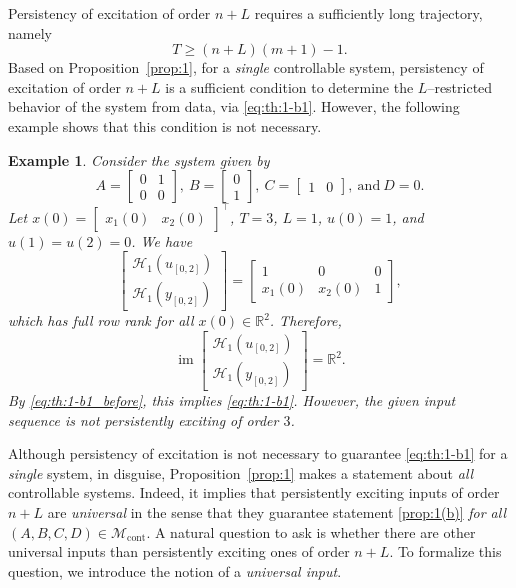 \documentclass[journal,twoside,web]{ieeecolor}
\newtheorem{example}[theorem]{Example}
\DeclareMathOperator{\im}{im}
\begin{document}
Persistency of excitation of order $n+L$ requires a sufficiently long trajectory, namely
\begin{equation}
T\geq (n+L)(m+1)-1.
\end{equation}
Based on Proposition~\ref{prop:1}, for a \emph{single} controllable system, persistency of excitation of order $n+L$ is a sufficient condition to determine the $L$--restricted behavior of the system from data, via \eqref{eq:th:1-b1}. However, the following example shows that this condition is not necessary. 
\begin{example}
\label{ex:1}
Consider the system given by
\begin{equation}
A=\begin{bmatrix}
0 & 1 \\
0 & 0
\end{bmatrix},\ B=\begin{bmatrix}
0 \\ 1
\end{bmatrix},\ C=\begin{bmatrix}
1 & 0
\end{bmatrix},\ \text{and}\ D=0.
\end{equation}
Let $x(0)=\begin{bmatrix}
x_1(0) & x_2(0)
\end{bmatrix}^\top$, $T=3$, $L=1$, $u(0)= 1$, and $u(1)=u(2)=0$. We have
\begin{equation}
\label{eq:ex1-1}
\begin{bmatrix}
\mathcal{H}_1(u_{[0,2]}) \\
\mathcal{H}_1(y_{[0,2]}) 
\end{bmatrix}
=\begin{bmatrix}
1   & 0   & 0 \\
x_1(0) & x_2(0) & 1 
\end{bmatrix},
\end{equation}
which has full row rank for all $x(0)\in\mathbb{R}^2$. Therefore, 
\begin{equation}
\im \begin{bmatrix}
\mathcal{H}_1(u_{[0,2]}) \\
\mathcal{H}_1(y_{[0,2]}) 
\end{bmatrix}=\mathbb{R}^2.
\end{equation}
By \eqref{eq:th:1-b1_before}, this implies \eqref{eq:th:1-b1}. However, the given input sequence is not persistently exciting of order $3$. 
\end{example}

Although persistency of excitation is not necessary to guarantee \eqref{eq:th:1-b1} for a \emph{single} system, in disguise, Proposition~\ref{prop:1} makes a statement about \emph{all} controllable systems. Indeed, it implies that persistently exciting inputs of order $n+L$ are \emph{universal} in the sense that they guarantee statement \ref{prop:1(b)} \emph{for all} $(A,B,C,D)\in\mathcal{M}_\text{cont}$. A natural question to ask is whether there are other universal inputs than persistently exciting ones of order $n+L$. To formalize this question, we introduce the notion of a \emph{universal input}. 
\end{document}
